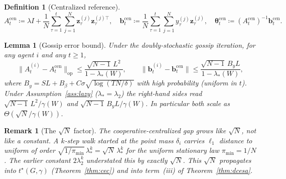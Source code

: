 \documentclass[11pt]{article}
\newtheorem{lemma}[theorem]{Lemma}
\newtheorem{definition}[theorem]{Definition}
\newtheorem*{remark}{Remark}
\begin{document}
\begin{definition}[Centralized reference]\label{def:cen}
\[
A_t^{\mathrm{cen}}\coloneqq\lambda I+\frac{1}{N}\sum_{\tau=1}^t\sum_{j=1}^N
\bm{z}_\tau^{(j)}\bm{z}_\tau^{(j)\top},\quad
\bm{b}_t^{\mathrm{cen}}\coloneqq\frac{1}{N}\sum_{\tau=1}^t\sum_{j=1}^N
y_\tau^{(j)}\bm{z}_\tau^{(j)},\quad
\bm{\theta}_t^{\mathrm{cen}}\coloneqq(A_t^{\mathrm{cen}})^{-1}\bm{b}_t^{\mathrm{cen}}.
\]
\end{definition}

\begin{lemma}[Gossip error bound]\label{lem:gossip}
Under the doubly-stochastic gossip iteration, for any agent $i$ and any $t\geq 1$,
\begin{equation}
\|A_t^{(i)}-A_t^{\mathrm{cen}}\|_{\mathrm{op}}
\leq\frac{\sqrt{N-1}\,L^2}{1-\lambda_*(W)},\qquad
\|\bm{b}_t^{(i)}-\bm{b}_t^{\mathrm{cen}}\|
\leq\frac{\sqrt{N-1}\,B_y L}{1-\lambda_*(W)},
\label{eq:gossip_err}
\end{equation}
where $B_y=SL+B_\beta+C\sigma\sqrt{\log(TN/\delta)}$
with high probability (uniform in $t$).
Under Assumption~\ref{ass:lazy} ($\lambda_*=\lambda_2$) the right-hand
sides read $\sqrt{N-1}\,L^2/\gamma(W)$ and
$\sqrt{N-1}\,B_y L/\gamma(W)$. In particular both scale as
$\Theta(\sqrt{N}/\gamma(W))$.
\end{lemma}

\begin{remark}[The $\sqrt{N}$ factor]\label{rem:sqrtN}
The cooperative-centralized gap grows like $\sqrt{N}$, not like a
constant.  A $k$-step walk started at the point mass $\delta_i$ carries
$\ell_1$ distance to uniform of order
$\sqrt{1/\pi_{\min}}\,\lambda_*^k=\sqrt{N}\,\lambda_*^k$ for the uniform
stationary law $\pi_{\min}=1/N$. The earlier constant $2\lambda_2^k$
understated this by exactly $\sqrt{N}$.  This $\sqrt{N}$ propagates
into $t^\star(G,\gamma)$ (Theorem~\ref{thm:cec}) and into term~(iii) of
Theorem~\ref{thm:dcesa}.
\end{remark}
\end{document}
